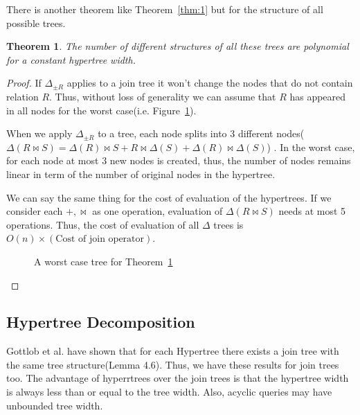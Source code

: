 \documentclass[12pt]{article}
\newtheorem{theorem}{Theorem}
\begin{document}
There is another theorem like Theorem~\ref{thm:1} but for the structure of all possible trees.
\begin{theorem}
\label{thm:2}
The number of different structures of all these trees are polynomial for a constant hypertree width.
\end{theorem}
\begin{proof}
If $\Delta_{\pm R}$ applies to a join tree it won't change the nodes that do not contain relation $R$. Thus, without loss of generality we can assume that $R$ has appeared in all nodes  for the worst case(i.e. Figure~\ref{fig2}). \par

When we apply $\Delta_{\pm R}$ to a tree, each node splits into 3 different nodes($\Delta(R\Join S)=\Delta(R)\Join S+R\Join\Delta(S)+\Delta(R)\Join\Delta(S)$) \cite{2}. In the worst case, for each node at most 3 new nodes is created, thus, the number of nodes remains linear in term of the number of original nodes in the hypertree. \par
We can say the same thing for the cost of evaluation of the hypertrees. 
If we consider each $+,\Join$ as one operation, evaluation of $\Delta(R\Join S)$ needs at most 5 operations. Thus, the cost of evaluation of all $\Delta$ trees is $O(n)\times(\text{Cost of join operator})$.
\begin{figure}[htbp]
\begin{center}
\end{center}
\caption{A worst case tree for Theorem~\ref{thm:2}}
\label{fig2}
\end{figure}
\end{proof}
\subsection{Hypertree Decomposition}
Gottlob et al. have shown that for each Hypertree there exists a join tree with the same tree structure(Lemma 4.6)\cite{1}. Thus, we have these results for join trees too. The advantage of hyperrtrees over the join trees is that the hypertree width is always less than or equal to the tree width. Also, acyclic queries may have unbounded tree width\cite{1}.\\\par
\end{document}
